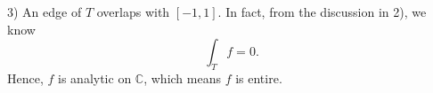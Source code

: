 \documentclass{article}%
\begin{document}
\begin{enumerate}
3) An edge of $T$ overlaps with $[-1, 1]$. In fact, from the discussion in 2), we know
$$
\int_{T} f = 0.
$$
Hence, $f$ is analytic on $\mathbb{C}$, which means $f$ is entire.


\end{enumerate}
\end{document}
